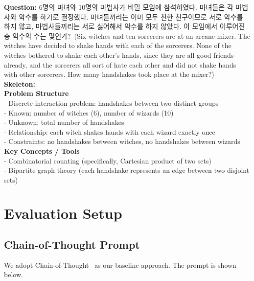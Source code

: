\begin{tcolorbox}[
  colback=blue!3,
  colframe=gray!60!black,
  boxrule=0.5pt,
  arc=4pt,
  left=6pt,
  right=6pt,
  top=4pt,
  bottom=4pt,
  title=Example~(2): Skeleton Generation
]
\small
\textbf{Question:} 6명의 마녀와 10명의 마법사가 비밀 모임에 참석하였다. 마녀들은 각 마법사와 악수를 하기로 결정했다. 마녀들끼리는 이미 모두 친한 친구이므로 서로 악수를 하지 않고, 마법사들끼리는 서로 싫어해서 악수를 하지 않았다. 이 모임에서 이루어진 총 악수의 수는 몇인가?~(Six witches and ten sorcerers are at an arcane mixer. The witches have decided to shake hands with each of the sorcerers. None of the witches bothered to shake each other's hands, since they are all good friends already, and the sorcerers all sort of hate each other and did not shake hands with other sorcerers. How many handshakes took place at the mixer?)\\[0.5em]

\textbf{Skeleton:}\\
\textbf{Problem Structure}\\
- Discrete interaction problem: handshakes between two distinct groups\\
- Known: number of witches (6), number of wizards (10)\\
- Unknown: total number of handshakes\\
- Relationship: each witch shakes hands with each wizard exactly once\\
- Constraints: no handshakes between witches, no handshakes between wizards\\[0.3em]
\textbf{Key Concepts / Tools}\\
- Combinatorial counting (specifically, Cartesian product of two sets)\\
- Bipartite graph theory (each handshake represents an edge between two disjoint sets)


\end{tcolorbox}





\section{Evaluation Setup}\label{Appendix:Evaluation-setup}

\subsection{Chain-of-Thought Prompt}
We adopt Chain-of-Thought~\citep{cot-neurips2022} as our baseline approach. The prompt is shown below.

